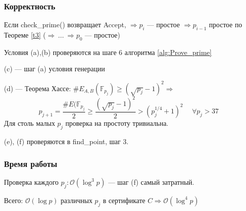 \documentclass[12pt]{article}
\newcommand{\F}{{{\mathbb F}}}
\newcommand{\bigO}{\mathcal{O}}
\theoremstyle{definition}
\theoremstyle{definition}
\theoremstyle{definition}
\begin{document}
\subsubsection{Корректность}
Если check\_prime() возвращает Accept, $\Rightarrow p_i$ — простое $\Rightarrow p_{i-1}$ простое по Теореме \ref{t3} ($\Rightarrow\ ...\ \Rightarrow p_0$ — простое)

Условия (a),(b) проверяются на шаге 6 алгоритма \ref{alg:Prove_prime}

(c) — шаг (a) условия генерации

(d) — Теорема Хассе: $\#E_{A,B}(\F_{p_j}) \geq (\sqrt{p_j} - 1)^2 \Rightarrow$
\[
    p_{j+1} = \frac{\#E(\F_{p_j}}{2} \geq \frac{(\sqrt{p_j} - 1)^2}{2} > (p_j^{1/4} + 1)^2\; \quad \forall p_j > 37
\]
Для столь малых $p_j$ проверка на простоту тривиальна.

(e), (f) проверяются в find\_point, шаг 3.

\subsubsection{Время работы}
Проверка каждого $p_j: \bigO(\log^3 p)$ — шаг (f) самый затратный.

Всего: $\bigO(\log p)$ различных $p_j$ в сертификате $C \Rightarrow \bigO(\log^4 p)$
\end{document}
